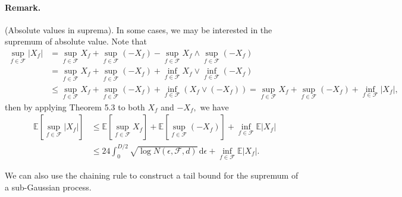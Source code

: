 \documentclass{article}
\newcommand{\E}{\mathbb{E}}
\begin{document}
\paragraph{Remark.} (Absolute values in suprema). In some cases, we may be interested in the supremum of absolute value. Note that
\begin{align*}
	\sup_{f\in\mathcal{F}}\vert X_f\vert &= \sup_{f\in\mathcal{F}} X_f +  \sup_{f\in\mathcal{F}} (-X_f) - \sup_{f\in\mathcal{F}} X_f\wedge \sup_{f\in\mathcal{F}} (-X_f)\\
	&= \sup_{f\in\mathcal{F}} X_f +  \sup_{f\in\mathcal{F}} (-X_f) + \inf_{f\in\mathcal{F}} X_f\vee \inf_{f\in\mathcal{F}} (-X_f)\\
	&\leq \sup_{f\in\mathcal{F}} X_f +  \sup_{f\in\mathcal{F}} (-X_f) + \inf_{f\in\mathcal{F}} \left(X_f \vee (-X_f)\right) =  \sup_{f\in\mathcal{F}} X_f +  \sup_{f\in\mathcal{F}} (-X_f) + \inf_{f\in\mathcal{F}}\vert X_f\vert,\tag{5.8}
\end{align*}
then by applying Theorem 5.3 to both $X_f$ and $-X_f,$ we have
\begin{align*}
	\E\left[\sup_{f\in\mathcal{F}}\vert X_f\vert\right]&\leq \E\left[\sup_{f\in\mathcal{F}} X_f\right] + \E\left[\sup_{f\in\mathcal{F}}(-X_f)\right] + \inf_{f\in\mathcal{F}}\E\vert X_f\vert\\
	&\leq 24\int_0^{D/2}\sqrt{\log N(\epsilon,\mathcal{F},d)}\,\mathrm{d}\epsilon + \inf_{f\in\mathcal{F}}\E\vert X_f\vert.\tag{5.9}
\end{align*}

We can also use the chaining rule to construct a tail bound for the supremum of a sub-Gaussian process.
\end{document}
